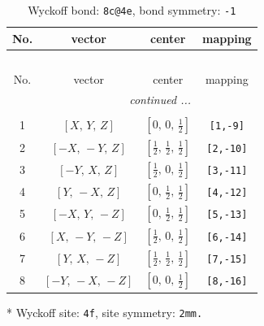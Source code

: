 \documentclass[fleqn,8pt]{jsarticle}
\begin{document}
\renewcommand{\arraystretch}{1.2}
\begin{longtable}{cccc}
\caption{Wyckoff bond: {\tt 8c@4e}, bond symmetry: {\tt -1}}
 \\
 \hline \hline
No. & vector & center & mapping \\ \hline \endfirsthead

\multicolumn{3}{l}{\tablename\ \thetable{}} \\
 \hline \hline
No. & vector & center & mapping \\ \hline \endhead

 \hline \hline
\multicolumn{3}{r}{\footnotesize\it continued ...} \\ \endfoot

 \hline \hline
\multicolumn{3}{r}{} \\ \endlastfoot

1 & $\left[ X,\, Y,\, Z \right]$ & $\left[ 0,\, 0,\, \frac{1}{2} \right]$ & {\tt [1,-9]} \\ \hline
2 & $\left[ - X,\, - Y,\, Z \right]$ & $\left[ \frac{1}{2},\, \frac{1}{2},\, \frac{1}{2} \right]$ & {\tt [2,-10]} \\ \hline
3 & $\left[ - Y,\, X,\, Z \right]$ & $\left[ \frac{1}{2},\, 0,\, \frac{1}{2} \right]$ & {\tt [3,-11]} \\ \hline
4 & $\left[ Y,\, - X,\, Z \right]$ & $\left[ 0,\, \frac{1}{2},\, \frac{1}{2} \right]$ & {\tt [4,-12]} \\ \hline
5 & $\left[ - X,\, Y,\, - Z \right]$ & $\left[ 0,\, \frac{1}{2},\, \frac{1}{2} \right]$ & {\tt [5,-13]} \\ \hline
6 & $\left[ X,\, - Y,\, - Z \right]$ & $\left[ \frac{1}{2},\, 0,\, \frac{1}{2} \right]$ & {\tt [6,-14]} \\ \hline
7 & $\left[ Y,\, X,\, - Z \right]$ & $\left[ \frac{1}{2},\, \frac{1}{2},\, \frac{1}{2} \right]$ & {\tt [7,-15]} \\ \hline
8 & $\left[ - Y,\, - X,\, - Z \right]$ & $\left[ 0,\, 0,\, \frac{1}{2} \right]$ & {\tt [8,-16]} \\
\end{longtable}
* Wyckoff site: {\tt 4f}, site symmetry: {\tt 2mm.}
\renewcommand{\arraystretch}{1.2}
\end{document}
